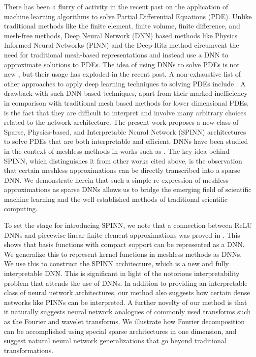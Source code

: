 \documentclass[12pt]{article}
\begin{document}
There has been a flurry of activity in the recent past on the application of machine learning algorithms to solve Partial Differential Equations (PDE). Unlike traditional methods like the finite element, finite volume, finite difference, and mesh-free methods, Deep Neural Network (DNN) based methods like Physics Informed Neural Networks (PINN) \cite{RPK2019} and the Deep-Ritz method \cite{EYu2018} circumvent the need for traditional mesh-based representations and instead use a DNN to approximate solutions to PDEs. The idea of using DNNs to solve PDEs is not new \cite{LLF97}, but their usage has exploded in the recent past. A non-exhaustive list of other approaches to apply deep learning techniques to solving PDEs include \cite{SiKo2018, HJE2018, LLMXD2018, lu2021deepxde, SAGNGHZR2020, WZ2020, LCX2020, CCLL2020, WXZZ2020pre, LTPGC2021, DS2020}. A drawback with such DNN based techniques, apart from their marked inefficiency in comparison with traditional mesh based methods for lower dimensional PDEs, is the fact that they are difficult to interpret and involve many arbitrary choices related to the network architecture. The present work proposes a new class of Sparse, Physics-based, and Interpretable Neural Network (SPINN) architectures to solve PDEs that are both interpretable and efficient. DNNs have been studied in the context of meshless methods in works such as \cite{HHM2020, WZ2020}. The key idea behind SPINN, which distinguishes it from other works cited above, is the observation that certain meshless approximations can be directly transcribed into a sparse DNN. We demonstrate herein that such a simple re-expression of meshless approximations as sparse DNNs allows us to bridge the emerging field of scientific machine learning and the well established methods of traditional scientific computing.

To set the stage for introducing SPINN, we note that a connection between ReLU DNNs and piecewise linear finite element approximations was proved in \cite{HLXZ2020}. This shows that basis functions with compact support can be represented as a DNN. We generalize this to represent kernel functions in meshless methods as DNNs. We use this to construct the SPINN architecture, which is a new and fully interpretable DNN. This is significant in light of the notorious interpretability problem that attends the use of DNNs. In addition to providing an interpretable class of neural network architectures, our method also suggests how certain dense networks like PINNs can be interpreted. A further novelty of our method is that it naturally suggests neural network analogues of commonly used transforms such as the Fourier and wavelet transforms. We illustrate how Fourier decomposition can be accomplished using special sparse architectures in one dimension, and suggest natural neural network generalizations that go beyond traditional transformations.
\end{document}
